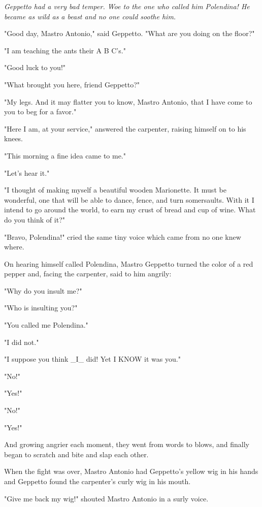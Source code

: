 \documentclass[12pt,twoside]{article}
\begin{document}
\bigskip
{\slshape%
  Geppetto had a very bad temper.  Woe to the one who
  called him Polendina!  He became as wild as a beast and
  no one could soothe him.

  "Good day, Mastro Antonio," said Geppetto.  "What
  are you doing on the floor?"

  "I am teaching the ants their A B C's."

  "Good luck to you!"

  "What brought you here, friend Geppetto?"

  "My legs.  And it may flatter you to know, Mastro
  Antonio, that I have come to you to beg for a favor."

  "Here I am, at your service," answered the carpenter,
  raising himself on to his knees.

  "This morning a fine idea came to me."

  "Let's hear it."

  "I thought of making myself a beautiful wooden
  Marionette.  It must be wonderful, one that will be able to
  dance, fence, and turn somersaults.  With it I intend to go
  around the world, to earn my crust of bread and cup of
  wine.  What do you think of it?"

  "Bravo, Polendina!" cried the same tiny voice which
  came from no one knew where.

  On hearing himself called Polendina, Mastro Geppetto
  turned the color of a red pepper and, facing the carpenter,
  said to him angrily:

  "Why do you insult me?"

  "Who is insulting you?"

  "You called me Polendina."

  "I did not."

  "I suppose you think \_I\_ did!  Yet I KNOW it was you."

  "No!"

  "Yes!"

  "No!"

  "Yes!"

  And growing angrier each moment, they went from
  words to blows, and finally began to scratch and bite and
  slap each other.

  When the fight was over, Mastro Antonio had Geppetto's
  yellow wig in his hands and Geppetto found the carpenter's
  curly wig in his mouth.

  "Give me back my wig!" shouted Mastro Antonio in a surly voice.

}
\end{document}
